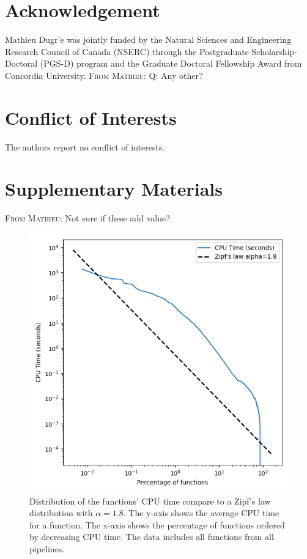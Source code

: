 \documentclass[conference]{IEEEtran}
\newcommand{\MD}[1]{\color{magenta}\textsc{From Mathieu: }#1\color{black}}
\begin{document}
\section*{Acknowledgement}
Mathieu Dugr'e was jointly funded by the Natural Sciences and Engineering Research Council of Canada (NSERC) through the Postgraduate Scholarship-Doctoral (PGS-D) program and the Graduate Doctoral Fellowship Award from Concordia University.
\MD{Q: Any other?}
													
\section*{Conflict of Interests}
The authors report no conflict of interests.
													

% 

													
\newpage
\onecolumn
\section*{Supplementary Materials}
\MD{Not sure if these add value?}
\label{sec:supplementary}

\begin{figure}[h]
	\centering
	\includegraphics{figures/global-zipf_law.png}
	\caption{Distribution of the functions' CPU time compare to a Zipf's law distribution with $\alpha=1.8$. The y-axis shows the average CPU time for a function. The x-axis shows the percentage of functions ordered by decreasing CPU time. The data includes all functions from all pipelines.}
	\label{sup-fig:zips-law}
\end{figure}
													
\end{document}
